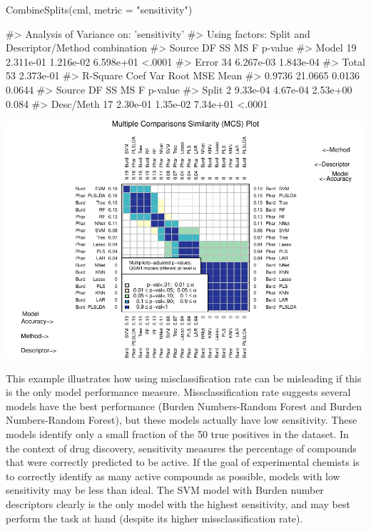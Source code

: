 \begin{Schunk}
\begin{Sinput}
CombineSplits(cml, metric = "sensitivity")
\end{Sinput}
\begin{Soutput}
#>    Analysis of Variance on: 'sensitivity'
#>  Using factors: Split and Descriptor/Method combination
#> Source    DF          SS          MS           F   p-value   
#> Model     19   2.311e-01   1.216e-02   6.598e+01    <.0001   
#> Error     34   6.267e-03   1.843e-04   
#> Total     53   2.373e-01   
#>       R-Square   Coef Var   Root MSE       Mean   
#>         0.9736    21.0665     0.0136     0.0644   
#> Source       DF         SS         MS          F   p-value   
#> Split         2   9.33e-04   4.67e-04   2.53e+00     0.084   
#> Desc/Meth    17   2.30e-01   1.35e-02   7.34e+01    <.0001
\end{Soutput}

\includegraphics{chemmodlabRJournal_files/figure-latex/CombineSplits_se-1} \end{Schunk}

This example illustrates how using misclassification rate can be
misleading if this is the only model performance measure.
Missclassification rate suggests several models have the best
performance (Burden Numbers-Random Forest and Burden Numbers-Random
Forest), but these models actually have low sensitivity. These models
identify only a small fraction of the 50 true positives in the dataset.
In the context of drug discovery, sensitivity measures the percentage of
compounds that were correctly predicted to be active. If the goal of
experimental chemists is to correctly identify as many active compounds
as possible, models with low sensitivity may be less than ideal. The SVM
model with Burden number descriptors clearly is the only model with the
highest sensitivity, and may best perform the task at hand (despite its
higher missclassification rate).


